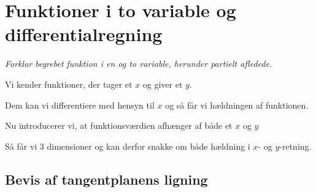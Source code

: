 \section{Funktioner i to variable og differentialregning}

\emph{Forklar begrebet funktion i en og to variable, herunder partielt afledede.} 

Vi kender funktioner, der tager et $x$ og giver et $y$.

Dem kan vi differentiere med hensyn til $x$ og så får vi hældningen af funktionen.

Nu introducerer vi, at funktionsværdien afhænger af både et $x$ og $y$

Så får vi 3 dimensioner og kan derfor snakke om både hældning i $x$- og $y$-retning.

\subsection{Bevis af tangentplanens ligning}

